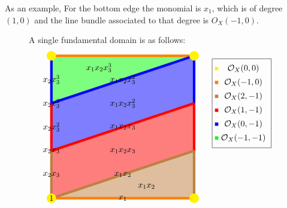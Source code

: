 \documentclass{amsart}
\begin{document}
As an example, For the bottom edge the monomial is $x_1$, which is of degree $(1,0)$ and the line bundle associated to that degree is $O_X(-1,0)$.

\begin{figure}
  A single fundamental domain is as follows:
\[
\begin{tikzpicture}[scale=2]
\fill[opacity=0.5, green] (0,2) -- (0,3) -- (3,3) -- cycle;
\fill[opacity=0.5, blue] (0,1) -- (0,2) -- (3,3) -- (3,2) -- (0,1);
\fill[opacity=0.5, red] (0,0) -- (0,1) -- (3,2) -- (3,1) -- (0,0);
\fill[opacity=0.5, brown] (0,0) -- (3,1) -- (3,0) -- (0,0);

\draw[line width=3pt, brown] (0,0) -- (0,1);
\draw[line width=3pt, red] (0,1) -- (0,2);
\draw[line width=3pt, blue] (0,2)-- (0,3);
\draw[line width=3pt, orange] (0,3) -- (3,3);

\draw[line width=3pt, brown] (3,0) -- (3,1);
\draw[line width=3pt, red] (3,1) -- (3,2);
\draw[line width=3pt, blue] (3,2)-- (3,3);


\draw[line width=3pt, orange] (3,0) -- (0,0);
\draw[line width=3pt, brown] (0,0) -- (3,1);
\draw[line width=3pt, red] (0,1) -- (3,2);
\draw[line width=3pt, blue] (0,2) -- (3,3);


\node[fill, circle, yellow, inner sep = 4pt] at (0,0) {};
\node[fill, circle, yellow, inner sep = 4pt] at (3,0) {};
\node[fill, circle, yellow, inner sep = 4pt] at (3,3) {};
\node[fill, circle, yellow, inner sep = 4pt] at (0,3) {};
\node at (0,0) {$1$};
\node at (0,1) {$x_2x_3$};
\node at (0,2) {$x_2x_3^2$};

\node at (1.5,0) {$x_1$};

\node at (0,0.5) {$x_2x_3$};
\node at (0,1.5) {$x_2x_3^2$};
\node at (0,2.5) {$x_2x_3^3$};


\node at (1.5,0.5) {$x_1x_2$};
\node at (1.5,1.5) {$x_1x_2x_3$};
\node at (1.5,2.5) {$x_1x_2x_3^2$};

\node at (2,0.25) {$x_1x_2$};
\node at (1.5,1) {$x_1x_2x_3$};
\node at (1.5,2) {$x_1x_2x_3^2$};
\node at (1,2.75) {$x_1x_2x_3^3$};

\matrix[draw] at (4,2) {
  \node[fill=yellow,inner sep = 2pt] {}; & \node {$\cO_{X}(0,0)$};\\
  \node[fill=orange,inner sep = 2pt] {}; & \node {$\cO_{X}(-1,0)$};\\
  \node[fill=brown,inner sep = 2pt] {}; & \node {$\cO_{X}(2,-1)$};\\
  \node[fill=red,inner sep = 2pt] {}; & \node {$\cO_{X}(1,-1)$};\\
  \node[fill=blue,inner sep = 2pt] {}; & \node {$\cO_{X}(0,-1)$};\\
  \node[fill=green,inner sep = 2pt] {}; & \node {$\cO_{X}(-1,-1)$};\\
};


\end{tikzpicture}\]
\end{figure}
\end{document}
